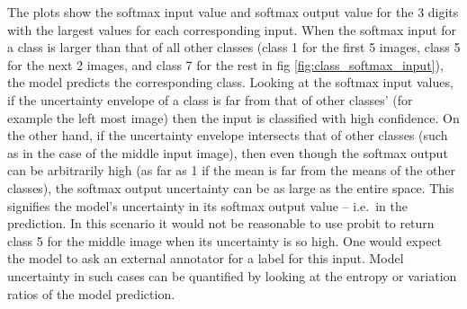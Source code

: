 \documentclass{article}
\theoremstyle{definition}
\begin{document}
The plots show the softmax input value and softmax output value for the 3 digits with the largest values for each corresponding input. When the softmax input for a class is larger than that of all other classes (class 1 for the first 5 images, class 5 for the next 2 images, and class 7 for the rest in fig \ref{fig:class_softmax_input}), the model predicts the corresponding class. Looking at the softmax input values, if the uncertainty envelope of a class is far from that of other classes' (for example the left most image) then the input is classified with high confidence. 
On the other hand, if the uncertainty envelope intersects that of other classes (such as in the case of the middle input image), then even though the softmax output can be arbitrarily high (as far as 1 if the mean is far from the means of the other classes), the softmax output uncertainty can be as large as the entire space. This signifies the model's uncertainty in its softmax output value -- i.e.\ in the prediction. 
In this scenario it would not be reasonable to use probit to return class 5 for the middle image when its uncertainty is so high. One would expect the model to ask an external annotator for a label for this input.
Model uncertainty in such cases can be quantified by looking at the entropy or variation ratios of the model prediction. 

\end{document}
